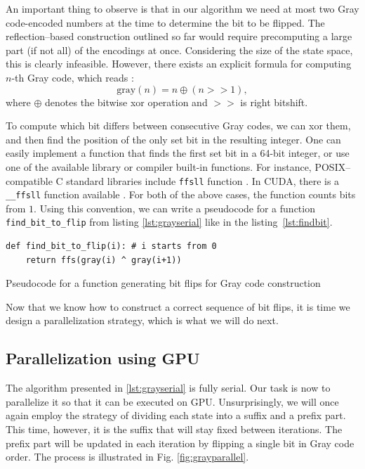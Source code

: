 An important thing to observe is that in our algorithm we need at most two Gray
code-encoded numbers at the time to determine the bit to be flipped. The
reflection--based construction outlined so far would require precomputing a
large part (if not all) of the encodings at once. Considering the size of the
state space, this is clearly infeasible. However, there exists an explicit
formula for computing $n$-th Gray code, which reads \cite{grayalgo}:
\begin{equation}
  \mbox{gray}(n) = n \oplus (n >> 1),
\end{equation}
where $\oplus$ denotes the bitwise xor operation and $>>$ is right bitshift.

To compute which bit differs between consecutive Gray codes, we can xor them,
and then find the position of the only set bit in the resulting integer. One
can easily implement a function that finds the first set bit in a 64-bit
integer, or use one of the available library or compiler built-in functions.
For instance, POSIX--compatible C standard libraries include \texttt{ffsll}
function \cite{ffs}. In CUDA, there is a \texttt{\_\_ffsll} function available
\cite{CUDAguide}. For both of the above cases, the function counts bits from
$1$. Using this convention, we can write a pseudocode for a function
\texttt{find\_bit\_to\_flip} from listing \ref{lst:grayserial} like in the
listing~\ref{lst:findbit}.

\begin{listing}
  \begin{verbatim}
def find_bit_to_flip(i): # i starts from 0
    return ffs(gray(i) ^ gray(i+1))
\end{verbatim}
  \caption{Pseudocode for a function generating bit flips for Gray code construction}
  \label{lst:findbit}
\end{listing}

Now that we know how to construct a correct sequence of bit flips, it is time
we design a parallelization strategy, which is what we will do next.

\subsection{Parallelization using GPU}
The algorithm presented in \ref{lst:grayserial} is fully serial. Our task is
now to parallelize it so that it can be executed on GPU. Unsurprisingly, we
will once again employ the strategy of dividing each state into a suffix and a
prefix part. This time, however, it is the suffix that will stay fixed between
iterations. The prefix part will be updated in each iteration by flipping a
single bit in Gray code order. The process is illustrated in Fig.
\ref{fig:grayparallel}.

